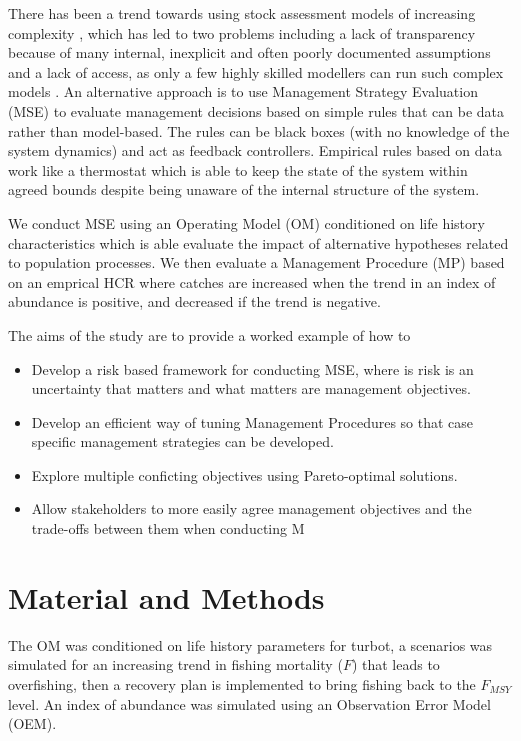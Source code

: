 \documentclass[12pt,doublespacing,a4paper]{ouparticle}
\begin{document}
There has been a trend towards using stock assessment models of increasing complexity \citep[e.g][]{}, which has led to two problems including a lack of transparency because of many internal, inexplicit and often poorly documented assumptions and a lack of access, as only a few highly skilled modellers can run such complex models \citep{hilborn2003state}.  An alternative approach is to use Management Strategy Evaluation (MSE) to evaluate management decisions based on simple rules that can be data rather than model-based. The rules can be black boxes (with no knowledge of the system dynamics) and act as feedback controllers. Empirical rules based on data work like a thermostat which is able to keep the state of the system within agreed bounds despite being unaware of the internal structure of the system. 

We conduct MSE using an Operating Model (OM) conditioned on life history characteristics which is able evaluate the impact of alternative hypotheses related to population processes. We then evaluate a Management Procedure (MP) based on an emprical HCR where catches are increased when the trend in an index of abundance is positive, and decreased if the trend is negative. 

The aims of the study are to provide a worked example of how to
 \begin{itemize}
  \item  Develop a risk based framework for conducting MSE,  where is risk is an uncertainty that matters and what matters are management objectives.
  \item  Develop an efficient way of tuning Management Procedures so that case specific management strategies can be developed.
  \item  Explore multiple conficting objectives using Pareto-optimal solutions.
  \item  Allow stakeholders to more easily agree management objectives and the trade-offs between them when conducting M
 \end{itemize}


\section{Material and Methods}

The OM was conditioned on life history parameters for turbot, a scenarios was simulated for an increasing trend in fishing mortality ($F$) that leads to overfishing, then a recovery plan is implemented to bring fishing back to the $F_{MSY}$ level. An index of abundance was simulated using an Observation Error Model (OEM).
\end{document}
